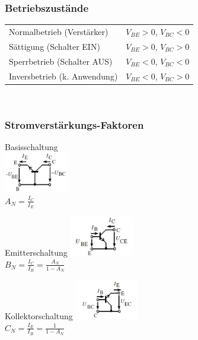 	\begin{multicols}{2}
	\subsubsection{Betriebszustände}
		\begin{tabular}{l l}
			Normalbetrieb (Verstärker) & $V_{BE} > 0$, $V_{BC} < 0$\\
			Sättigung (Schalter EIN) & $V_{BE} > 0$, $V_{BC} > 0$\\
			Sperrbetrieb (Schalter AUS) & $V_{BE} < 0$, $V_{BC} < 0$\\
			Inversbetrieb (k. Anwendung) & $V_{BE} < 0$, $V_{BC} > 0$
		\end{tabular} \\
	\columnbreak
	\subsubsection{Stromverstärkungs-Faktoren}
		\begin{minipage}[c]{2.8cm}
			Basisschaltung \\
			\includegraphics[width=2.8cm]{images/bip-basissch}\\
			$A_N=\frac{I_C}{I_E}$ \\
		\end{minipage}
		\begin{minipage}[c]{2.8cm}
			Emitterschaltung
			\includegraphics[width=2.8cm]{images/bip-emittersch}\\
			$B_N=\frac{I_C}{I_B}=\frac{A_N}{1-A_N}$ \\
		\end{minipage}
		\begin{minipage}[c]{2.8cm}
			Kollektorschaltung
			\includegraphics[width=2.8cm]{images/bip-kollektorsch}\\
			$C_N=\frac{I_E}{I_B}=\frac{1}{1-A_N}$ \\
		\end{minipage}
	\end{multicols}
	
